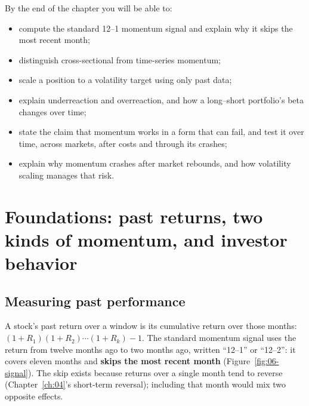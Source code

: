By the end of the chapter you will be able to:

\begin{itemize}
  \item compute the standard 12--1 momentum signal and explain why it skips the most recent month;
  \item distinguish cross-sectional from time-series momentum;
  \item scale a position to a volatility target using only past data;
  \item explain underreaction and overreaction, and how a long--short portfolio's beta changes over time;
  \item state the claim that momentum works in a form that can fail, and test it over time, across markets, after costs and through its crashes;
  \item explain why momentum crashes after market rebounds, and how volatility scaling manages that risk.
\end{itemize}

\section{Foundations: past returns, two kinds of momentum, and investor behavior}
\label{sec:06-foundations}

\subsection{Measuring past performance}

A stock's past return over a window is its cumulative return over those months: $(1 + R_1)(1 + R_2)\cdots(1 + R_k) - 1$. The standard momentum signal uses the return from twelve months ago to two months ago, written ``12--1'' or ``12--2'': it covers eleven months and \textbf{skips the most recent month} (Figure~\ref{fig:06-signal}). The skip exists because returns over a single month tend to reverse (Chapter~\ref{ch:04}'s short-term reversal); including that month would mix two opposite effects.

